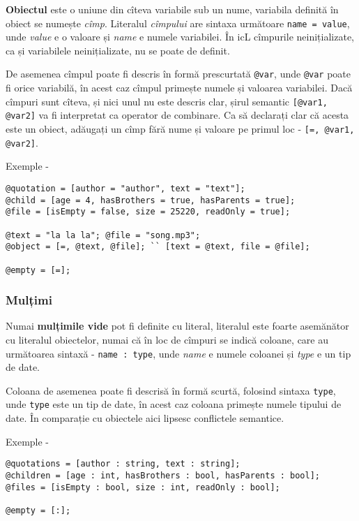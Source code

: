 {\bf Obiectul} este o uniune din cîteva variabile sub un nume, variabila definită în obiect se numește {\it cîmp}. Literalul {\it cîmpului} are sintaxa următoare \lstinline|name = value|, unde  {\it value} e o valoare și {\it name} e numele variabilei. În icL cîmpurile neinițializate, ca și variabilele neinițializate, nu se poate de definit.

De asemenea cîmpul poate fi descris în formă prescurtată \lstinline|@var|, unde \lstinline|@var| poate fi orice variabilă, în acest caz cîmpul primește numele și valoarea variabilei. Dacă cîmpuri sunt cîteva, și nici unul nu este descris clar, șirul semantic \lstinline|[@var1, @var2]| va fi interpretat ca operator de combinare. Ca să declarați clar că acesta este un obiect, adăugați un cîmp fără nume și valoare pe primul loc - \lstinline|[=, @var1, @var2]|.

\noindent Exemple -
\begin{lstlisting}[numbers=none]
@quotation = [author = "author", text = "text"];
@child = [age = 4, hasBrothers = true, hasParents = true];
@file = [isEmpty = false, size = 25220, readOnly = true];

@text = "la la la"; @file = "song.mp3";
@object = [=, @text, @file]; `` [text = @text, file = @file];

@empty = [=];
\end{lstlisting}

\subsubsection{Mulțimi}

Numai {\bf mulțimile vide} pot fi definite cu literal, literalul este foarte asemănător cu literalul obiectelor, numai că în loc de cîmpuri se indică coloane, care au următoarea sintaxă - \lstinline|name : type|, unde  {\it name} e numele coloanei și {\it type} e un tip de date.

Coloana de asemenea poate fi descrisă în formă scurtă, folosind sintaxa \lstinline|type|, unde \lstinline|type| este un tip de date, în acest caz coloana primește numele tipului de date. În comparație cu obiectele aici lipsesc conflictele semantice.

\noindent Exemple -
\begin{lstlisting}[numbers=none]
@quotations = [author : string, text : string];
@children = [age : int, hasBrothers : bool, hasParents : bool];
@files = [isEmpty : bool, size : int, readOnly : bool];

@empty = [:];
\end{lstlisting}

